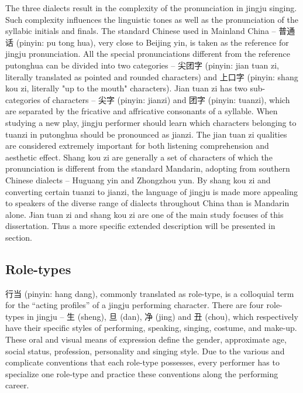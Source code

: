 The three dialects result in the complexity of the pronunciation in jingju singing. Such complexity influences the linguistic tones as well as the pronunciation of the syllabic initials and finals. The standard Chinese used in Mainland China -- 普通话 (pinyin: pu tong hua), very close to Beijing yin, is taken as the reference for jingju pronunciation. All the special pronunciations different from the reference putonghua can be divided into two categories -- 尖团字 (pinyin: jian tuan zi, literally translated as pointed and rounded characters) and 上口字 (pinyin: shang kou zi, literally "up to the mouth" characters). Jian tuan zi has two sub-categories of characters -- 尖字 (pinyin: jianzi) and 团字 (pinyin: tuanzi), which are separated by the fricative and affricative consonants of a syllable. When studying a new play, jingju performer should learn which characters belonging to tuanzi in putonghua should be pronounced as jianzi. The jian tuan zi qualities are considered extremely important for both listening comprehension and aesthetic effect. Shang kou zi are generally a set of characters of which the pronunciation is different from the standard Mandarin, adopting from southern Chinese dialects -- Huguang yin and Zhongzhou yun. By shang kou zi and converting certain tuanzi to jianzi, the language of jingju is made more appealing to speakers of the diverse range of dialects throughout China than is Mandarin alone. Jian tuan zi and shang kou zi are one of the main study focuses of this dissertation. Thus a more specific extended description will be presented in section. 

\subsection{Role-types}

行当 (pinyin: hang dang), commonly translated as role-type, is a colloquial term for the “acting profiles” of a jingju performing character. There are four role-types in jingju -- 生 (sheng), 旦 (dan), 净 (jing) and 丑 (chou), which respectively have their specific styles of performing, speaking, singing, costume, and make-up. These oral and visual means of expression define the gender, approximate age, social status, profession, personality and singing style. Due to the various and complicate conventions that each role-type possesses, every performer has to specialize one role-type and practice these conventions along the performing career. 

